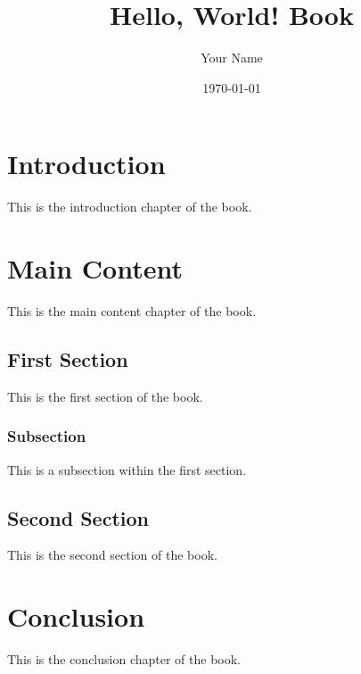 \documentclass{book}
\begin{document}
\title{Hello, World! Book}
\author{Your Name}
\date{\today}

\maketitle

\tableofcontents

\chapter{Introduction}
This is the introduction chapter of the book.

\chapter{Main Content}
This is the main content chapter of the book.

\section{First Section}
This is the first section of the book.

\subsection{Subsection}
This is a subsection within the first section.

\section{Second Section}
This is the second section of the book.

\chapter{Conclusion}
This is the conclusion chapter of the book.
\end{document}
